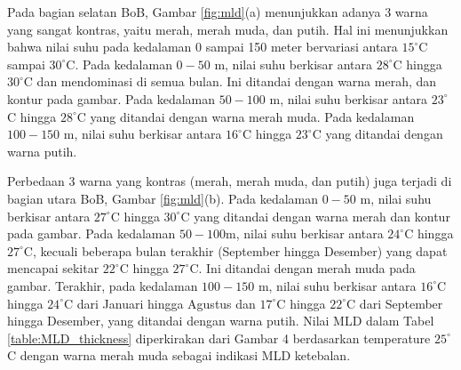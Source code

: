 \begin{spacing}{1.5}
	Pada bagian selatan BoB, Gambar \ref{fig:mld}(a) menunjukkan adanya 3 warna yang sangat kontras, yaitu merah, merah muda, dan putih. Hal ini menunjukkan bahwa nilai suhu pada kedalaman 0 sampai 150 meter bervariasi antara $15^\circ$C sampai $30^\circ$C. Pada kedalaman $0-50$ m, nilai suhu berkisar antara $28^\circ$C hingga $30^\circ$C dan mendominasi di semua bulan. Ini ditandai dengan warna merah, dan kontur pada gambar. Pada kedalaman $50-100$ m, nilai suhu berkisar antara $23^\circ$C hingga $28^\circ$C yang ditandai dengan warna merah muda. Pada kedalaman $100-150$ m, nilai suhu berkisar antara $16^\circ$C hingga $23^\circ$C yang ditandai dengan warna putih.
	
	Perbedaan 3 warna yang kontras (merah, merah muda, dan putih) juga terjadi di bagian utara BoB, Gambar \ref{fig:mld}(b). Pada kedalaman $0-50$ m, nilai suhu berkisar antara $27^\circ$C hingga $30^\circ$C yang ditandai dengan warna merah dan kontur pada gambar. Pada kedalaman $50-100$m, nilai suhu berkisar antara $24^\circ$C hingga $27^\circ$C, kecuali beberapa bulan terakhir (September hingga Desember) yang dapat mencapai sekitar $22^\circ$C hingga $27^\circ$C. Ini ditandai dengan merah muda pada gambar. Terakhir, pada kedalaman $100 - 150$ m, nilai suhu berkisar antara $16^\circ$C hingga $24^\circ$C dari Januari hingga Agustus dan $17^\circ$C hingga $22^\circ$C dari September hingga Desember, yang ditandai dengan warna putih. Nilai MLD dalam Tabel \ref{table:MLD_thickness} diperkirakan dari Gambar 4 berdasarkan temperature $25^\circ$C dengan warna merah muda sebagai indikasi MLD ketebalan.


\end{spacing}
